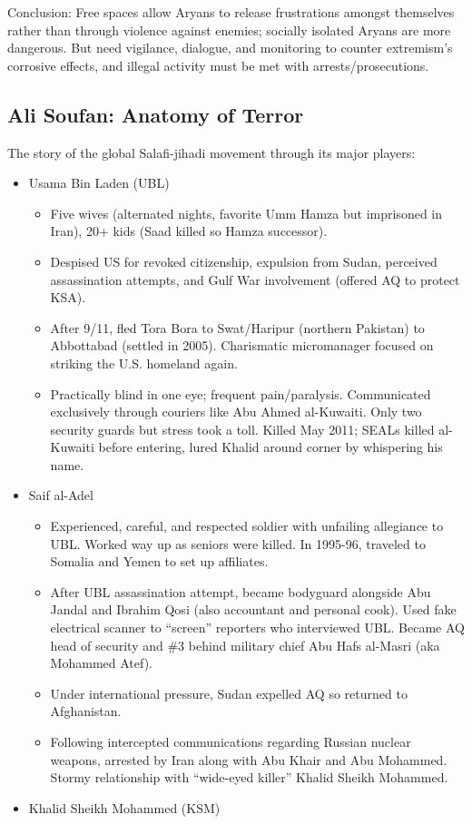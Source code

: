 \documentclass[
]{article}
\begin{document}
Conclusion: Free spaces allow Aryans to release frustrations amongst
themselves rather than through violence against enemies; socially
isolated Aryans are more dangerous. But need vigilance, dialogue, and
monitoring to counter extremism's corrosive effects, and illegal
activity must be met with arrests/prosecutions.

\hypertarget{ali-soufan-anatomy-of-terror}{%
\subsection{Ali Soufan: Anatomy of
Terror}\label{ali-soufan-anatomy-of-terror}}

The story of the global Salafi-jihadi movement through its major
players:

\begin{itemize}
\item
  Usama Bin Laden (UBL)

  \begin{itemize}
  \item
    Five wives (alternated nights, favorite Umm Hamza but imprisoned in
    Iran), 20+ kids (Saad killed so Hamza successor).
  \item
    Despised US for revoked citizenship, expulsion from Sudan, perceived
    assassination attempts, and Gulf War involvement (offered AQ to
    protect KSA).
  \item
    After 9/11, fled Tora Bora to Swat/Haripur (northern Pakistan) to
    Abbottabad (settled in 2005). Charismatic micromanager focused on
    striking the U.S. homeland again.
  \item
    Practically blind in one eye; frequent pain/paralysis. Communicated
    exclusively through couriers like Abu Ahmed al-Kuwaiti. Only two
    security guards but stress took a toll. Killed May 2011; SEALs
    killed al-Kuwaiti before entering, lured Khalid around corner by
    whispering his name.
  \end{itemize}
\item
  Saif al-Adel

  \begin{itemize}
  \item
    Experienced, careful, and respected soldier with unfailing
    allegiance to UBL. Worked way up as seniors were killed. In 1995-96,
    traveled to Somalia and Yemen to set up affiliates.
  \item
    After UBL assassination attempt, became bodyguard alongside Abu
    Jandal and Ibrahim Qosi (also accountant and personal cook). Used
    fake electrical scanner to ``screen'' reporters who interviewed UBL.
    Became AQ head of security and \#3 behind military chief Abu Hafs
    al-Masri (aka Mohammed Atef).
  \item
    Under international pressure, Sudan expelled AQ so returned to
    Afghanistan.
  \item
    Following intercepted communications regarding Russian nuclear
    weapons, arrested by Iran along with Abu Khair and Abu Mohammed.
    Stormy relationship with ``wide-eyed killer'' Khalid Sheikh
    Mohammed.
  \end{itemize}
\item
  Khalid Sheikh Mohammed (KSM)


\end{itemize}
\end{document}
